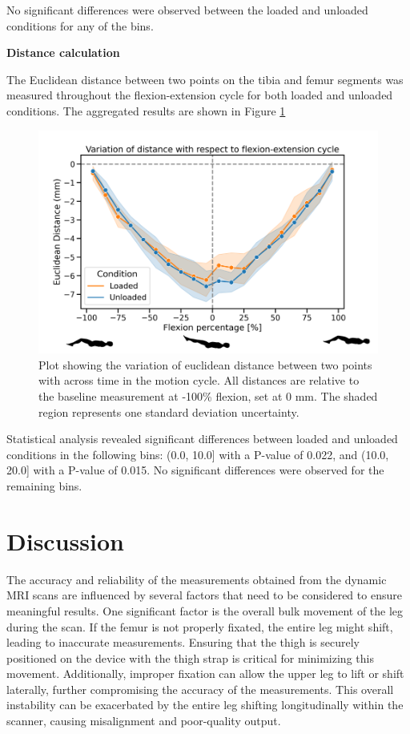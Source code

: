 \documentclass{micro-econ-thesis}
\begin{document}
No significant differences were observed between the loaded and unloaded conditions for any of the bins.

\textbf{Distance calculation }

The Euclidean distance between two points on the tibia and femur segments was measured throughout the flexion-extension cycle for both loaded and unloaded conditions. The aggregated results are shown in Figure \ref{fig:resultsdistancestickman}
\begin{figure}[H]
	\centering
	\includegraphics[width=0.7\linewidth]{results_distance_stickman}
	\caption{Plot showing the variation of euclidean distance between two points with across time in the motion cycle. All distances are relative to the baseline measurement at -100\% flexion, set at 0 mm. The shaded region represents one standard deviation uncertainty.}
	\label{fig:resultsdistancestickman}
\end{figure}

Statistical analysis revealed significant differences between loaded and unloaded conditions in the following bins: (0.0, 10.0] with a P-value of 0.022, and (10.0, 20.0] with a P-value of 0.015. No significant differences were observed for the remaining bins.

\section{Discussion}

The accuracy and reliability of the measurements obtained from the dynamic MRI scans are influenced by several factors that need to be considered to ensure meaningful results. One significant factor is the overall bulk movement of the leg during the scan. If the femur is not properly fixated, the entire leg might shift, leading to inaccurate measurements. Ensuring that the thigh is securely positioned on the device with the thigh strap is critical for minimizing this movement. Additionally, improper fixation can allow the upper leg to lift or shift laterally, further compromising the accuracy of the measurements. This overall instability can be exacerbated by the entire leg shifting longitudinally within the scanner, causing misalignment and poor-quality output.
\end{document}
